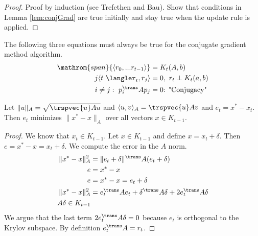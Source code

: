 \begin{proof}
Proof by induction (see Trefethen and Bau). Show that conditions in Lemma \ref{lem:conjGrad} are true initially and stay true when the update rule is applied.  
\end{proof}
\begin{lemma}\label{lem:conjGrad}
The following three equations must always be true for the conjugate gradient method algorithm.
\begin{align*}
\mathrom{span}{\langle r_0, ...r_{t-1}\rangle} &= K_t(A,b) \\
j\langle t \ \langler_t, r_j\rangle &= 0, \ r_t \perp K_t(a,b) \\
i \neq j: \ p_i^{\trans} A p_j &= 0 \text{: "Conjugacy"} 
\end{align*}
\end{lemma}

\begin{lemma}
Let $\|u\|_A = \sqrt{\trspvec{u} A u}$ and $\langle u,v\rangle_A = \trspvec{u} A v$ and $e_t = x^* - x_t$. Then $e_t$ minimizes $\|x^* - x\|_A$ over all vectors $x \in K_{t-1}$.
\end{lemma}

\begin{proof}
We know that $x_t \in K_{t-1}$. Let $x \in K_{t-1}$ and define $x = x_t + \delta$. Then $e = x^* - x = x_t + \delta$. We compute the error in the $A$ norm.
\begin{align*}
\|x^* - x\|_A^2 &= \|e_t + \delta\|^{\trans} A(e_t + \delta) \\
e &= x^* - x \\
e &= x^* - x = e_t + \delta \\ 
\|x^* - x\|_A^2 &= e_t^{\trans}Ae_t + \delta^{\trans}A\delta + 2e_t^{\trans} A \delta \\
A\delta \in K_{t-1}
\end{align*}
We argue that the last term $2e_t^{\trans} A \delta = 0$ because $e_t$ is orthogonal to the Krylov subspace. By definition $e_t^{\trans}A = r_t$.
\end{proof}
